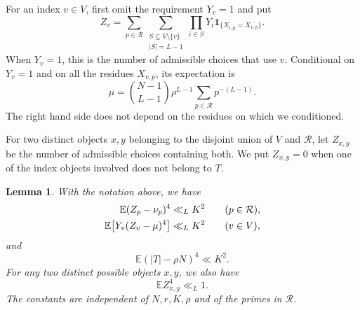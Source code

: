 \documentclass[11pt,reqno]{amsart}
\numberwithin{equation}{section}
\newtheorem{lemma}[theorem]{Lemma}
\begin{document}
For an index $v\in V$, first omit the requirement $Y_v=1$ and put
\[
 Z_v=\sum_{p\in\mathcal R}
      \sum_{\substack{S\subseteq V\setminus\{v\}\\|S|=L-1}}
      \prod_{i\in S}Y_i\mathbf1_{\{X_{i,p}=X_{v,p}\}}.
\]
When $Y_v=1$, this is the number of admissible choices that use $v$. Conditional on $Y_v=1$ and on all the residues $X_{v,p}$, its expectation is
\begin{equation}\label{eq-prime-index-mean}
 \mu=\binom{N-1}{L-1}\rho^{L-1}
       \sum_{p\in\mathcal R}p^{-(L-1)}.
\end{equation}
The right hand side does not depend on the residues on which we conditioned.

For two distinct objects $x,y$ belonging to the disjoint union of $V$ and $\mathcal R$, let $Z_{x,y}$ be the number of admissible choices containing both. We put $Z_{x,y}=0$ when one of the index objects involved does not belong to $T$.

\begin{lemma}\label{lem-prime-moments}
With the notation above, we have
\begin{align}\label{eq-prime-count-moments}
 \mathbb E(Z_p-\nu_p)^4&\ll_L K^2
          \qquad(p\in\mathcal R),\notag\\
 \mathbb E\bigl[Y_v(Z_v-\mu)^4\bigr]&\ll_L K^2
          \qquad(v\in V),
\end{align}
and
\begin{equation}\label{eq-prime-size-moment}
 \mathbb E(|T|-\rho N)^4\ll K^2.
\end{equation}
For any two distinct possible objects $x,y$, we also have
\begin{equation}\label{eq-prime-overlap-moment}
 \mathbb E Z_{x,y}^4\ll_L1.
\end{equation}
The constants are independent of $N,r,K,\rho$ and of the primes in $\mathcal R$.
\end{lemma}
\end{document}
